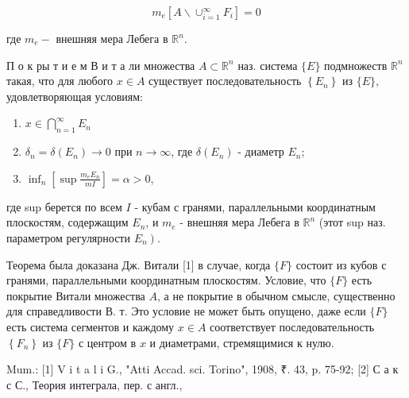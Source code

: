 \documentclass[10pt]{article}
\begin{document}
\[

m_{e}\left[A \backslash \cup_{i=1}^{\infty} F_{i}\right]=0

\]



где $m_{e}-$ внешняя мера Лебега в $\mathbb{R}^{n}$.



П о к ры т и е м В и т а ли множества $A \subset \mathbb{R}^{n}$ наз. система $\{E\}$ подмножеств $\mathbb{R}^{n}$ такая, что для любого $x \in A$ существует последовательность $\left\{E_{n}\right\}$ из $\{E\}$, удовлетворяющая условиям:



\begin{enumerate}

  \item $x \in \bigcap_{n=1}^{\infty} E_{n}$



  \item $\delta_{n}=\delta\left(E_{n}\right) \longrightarrow 0$ при $n \longrightarrow \infty$, где $\delta\left(E_{n}\right)$ - диаметр $E_{n}$;



  \item $\inf _{n}\left[\sup \frac{m_{e} E_{n}}{m I}\right]=\alpha>0$,



\end{enumerate}



где sup берется по всем $I$ - кубам с гранями, параллельными координатным плоскостям, содержащим $E_{n}$, и $m_{e}$ - внешняя мера Лебега в $\mathbb{R}^{n}$ (этот sup наз. параметром регулярности $\left.E_{n}\right)$.



Теорема была доказана Дж. Витали [1] в случае, когда $\{F\}$ состоит из кубов с гранями, параллельными координатным плоскостям. Условие, что $\{F\}$ есть покрытие Витали множества $A$, а не покрытие в обычном смысле, существенно для справедливости В. т. Это условие не может быть опущено, даже если $\{F\}$ есть система сегментов и каждому $x \in A$ соответствует последовательность $\left\{F_{n}\right\}$ из $\{F\}$ с центром в $x$ и диаметрами, стремящимися к нулю.



Mum.: [1] V i t a l i G., "Atti Accad. sci. Torino", 1908, ₹. 43, p. 75-92; [2] С а к с С., Теория интеграла, пер. с англ.,
\end{document}

